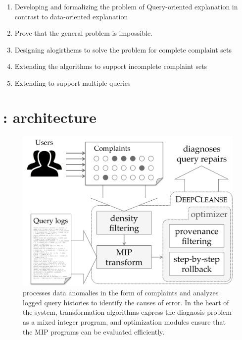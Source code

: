 {\begin{enumerate}
\item Developing and formalizing the problem of Query-oriented explanation in contrast to data-oriented explanation
\item Prove that the general problem is impossible.
\item Designing alogirthems to solve the problem for complete complaint sets
\item Extending the algorithms to support incomplete complaint sets
\item Extending to support multiple queries
\end{enumerate}


}


\section{{\Large\textbf{\sys}}: architecture}


\begin{figure}[t]
    \centering
        \includegraphics[scale=0.35]{figures/architecture}
    \caption{\sys processes data anomalies in the form of complaints and analyzes logged query histories to identify the causes of error. In the heart of the system, transformation algorithms express the diagnosis problem as a mixed integer program, and optimization modules ensure that the MIP programs can be evaluated efficiently.}
    \label{fig:architecture}
\end{figure}




